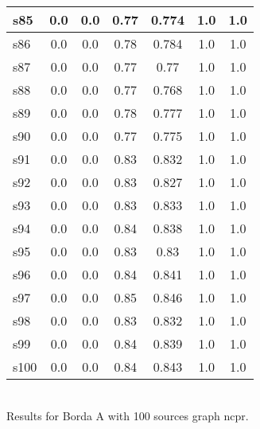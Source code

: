 \documentclass{article}
\begin{document}
\begin{tabular}{|l|c|c|c|c|c|c|}
\hline
s85 &0.0 & 0.0 & 0.77 & 0.774 & 1.0 & 1.0\\
\hline
s86 &0.0 & 0.0 & 0.78 & 0.784 & 1.0 & 1.0\\
\hline
s87 &0.0 & 0.0 & 0.77 & 0.77 & 1.0 & 1.0\\
\hline
s88 &0.0 & 0.0 & 0.77 & 0.768 & 1.0 & 1.0\\
\hline
s89 &0.0 & 0.0 & 0.78 & 0.777 & 1.0 & 1.0\\
\hline
s90 &0.0 & 0.0 & 0.77 & 0.775 & 1.0 & 1.0\\
\hline
s91 &0.0 & 0.0 & 0.83 & 0.832 & 1.0 & 1.0\\
\hline
s92 &0.0 & 0.0 & 0.83 & 0.827 & 1.0 & 1.0\\
\hline
s93 &0.0 & 0.0 & 0.83 & 0.833 & 1.0 & 1.0\\
\hline
s94 &0.0 & 0.0 & 0.84 & 0.838 & 1.0 & 1.0\\
\hline
s95 &0.0 & 0.0 & 0.83 & 0.83 & 1.0 & 1.0\\
\hline
s96 &0.0 & 0.0 & 0.84 & 0.841 & 1.0 & 1.0\\
\hline
s97 &0.0 & 0.0 & 0.85 & 0.846 & 1.0 & 1.0\\
\hline
s98 &0.0 & 0.0 & 0.83 & 0.832 & 1.0 & 1.0\\
\hline
s99 &0.0 & 0.0 & 0.84 & 0.839 & 1.0 & 1.0\\
\hline
s100 &0.0 & 0.0 & 0.84 & 0.843 & 1.0 & 1.0\\
\hline
\end{tabular}\\

\noindent Results for Borda A with 100 sources graph ncpr.
\end{document}
